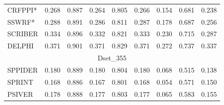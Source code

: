 \documentclass[a0,portrait]{a0poster}
\begin{document}
\begin{multicols}{2}
\begin{mdframed}[linewidth=7pt]
\begin{minipage}[b]{0.48\linewidth}
{\begin{tabular}{@{}l@{\ }*{8}{r}}
    CRFPPI\cite{wei2015cascade}* & \cellcolor[rgb]{ .698,  .78,  .643}0.268 & \cellcolor[rgb]{ .635,  .733,  .569}0.887 & \cellcolor[rgb]{ .714,  .792,  .659}0.264 & \cellcolor[rgb]{ .667,  .757,  .604}0.805 & \cellcolor[rgb]{ .706,  .784,  .651}0.266 & \cellcolor[rgb]{ .698,  .78,  .643}0.154 & \cellcolor[rgb]{ .502,  .635,  .412}0.681 & \cellcolor[rgb]{ .706,  .784,  .651}0.238 \\
    SSWRF\cite{wei2016protein}* & \cellcolor[rgb]{ .627,  .729,  .561}0.288 & \cellcolor[rgb]{ .549,  .671,  .471}0.891 & \cellcolor[rgb]{ .635,  .733,  .569}0.286 & \cellcolor[rgb]{ .584,  .694,  .506}0.811 & \cellcolor[rgb]{ .631,  .729,  .565}0.287 & \cellcolor[rgb]{ .624,  .725,  .557}0.178 & \cellcolor[rgb]{ .482,  .624,  .388}0.687 & \cellcolor[rgb]{ .639,  .737,  .573}0.256 \\
    SCRIBER\cite{zhang2019scriber} & \cellcolor[rgb]{ .463,  .608,  .365}0.334 & \cellcolor[rgb]{ .443,  .592,  .341}0.896 & \cellcolor[rgb]{ .471,  .612,  .373}0.332 & \cellcolor[rgb]{ .443,  .592,  .341}0.821 & \cellcolor[rgb]{ .467,  .612,  .369}0.333 & \cellcolor[rgb]{ .463,  .608,  .365}0.230 & \cellcolor[rgb]{ .4,  .561,  .29}0.715 & \cellcolor[rgb]{ .522,  .651,  .435}0.287 \\
    DELPHI & \cellcolor[rgb]{ .329,  .51,  .208}0.371 & \cellcolor[rgb]{ .329,  .51,  .208}0.901 & \cellcolor[rgb]{ .329,  .51,  .208}0.371 & \cellcolor[rgb]{ .329,  .51,  .208}0.829 & \cellcolor[rgb]{ .329,  .51,  .208}0.371 & \cellcolor[rgb]{ .329,  .51,  .208}0.272 & \cellcolor[rgb]{ .329,  .51,  .208}0.737 & \cellcolor[rgb]{ .329,  .51,  .208}0.337 \\
    \hline
    \multicolumn{9}{c}{Dset\_355} \\
    \hline
    SPPIDER & \cellcolor[rgb]{ .961,  .973,  .957}0.180 & \cellcolor[rgb]{ .949,  .965,  .941}0.889 & \cellcolor[rgb]{ .961,  .973,  .953}0.180 & \cellcolor[rgb]{ .957,  .969,  .949}0.804 & \cellcolor[rgb]{ .961,  .973,  .953}0.180 & \cellcolor[rgb]{ .961,  .973,  .953}0.068 & 0.515 & 0.138 \\
    SPRINT & 0.168 & 0.886 & 0.167 & 0.801 & 0.168 & 0.054 & \cellcolor[rgb]{ .839,  .882,  .808}0.571 & \cellcolor[rgb]{ .961,  .973,  .953}0.150 \\
    PSIVER & \cellcolor[rgb]{ .969,  .976,  .965}0.178 & \cellcolor[rgb]{ .965,  .976,  .957}0.888 & \cellcolor[rgb]{ .969,  .976,  .965}0.177 & \cellcolor[rgb]{ .969,  .976,  .961}0.803 & \cellcolor[rgb]{ .969,  .976,  .965}0.177 & \cellcolor[rgb]{ .969,  .976,  .965}0.065 & \cellcolor[rgb]{ .804,  .859,  .769}0.583 & \cellcolor[rgb]{ .941,  .957,  .929}0.155 \\

\end{tabular}}
\end{minipage}
\end{mdframed}
\end{multicols}
\end{document}
